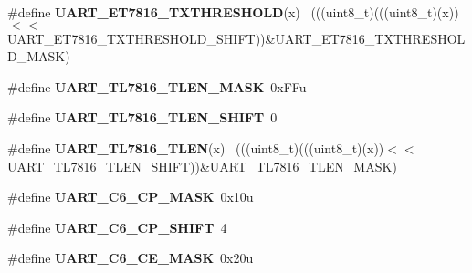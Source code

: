 \begin{DoxyCompactItemize}
\item 
\hypertarget{group___u_a_r_t___register___masks_ga0e12a6d9606ae3055889260cc5e0edff}{}\#define {\bfseries U\+A\+R\+T\+\_\+\+E\+T7816\+\_\+\+T\+X\+T\+H\+R\+E\+S\+H\+O\+L\+D}(x)                          ~(((uint8\+\_\+t)(((uint8\+\_\+t)(x))$<$$<$U\+A\+R\+T\+\_\+\+E\+T7816\+\_\+\+T\+X\+T\+H\+R\+E\+S\+H\+O\+L\+D\+\_\+\+S\+H\+I\+F\+T))\&U\+A\+R\+T\+\_\+\+E\+T7816\+\_\+\+T\+X\+T\+H\+R\+E\+S\+H\+O\+L\+D\+\_\+\+M\+A\+S\+K)\label{group___u_a_r_t___register___masks_ga0e12a6d9606ae3055889260cc5e0edff}

\item 
\hypertarget{group___u_a_r_t___register___masks_ga000fb6043015c4cb478d32febfb4a913}{}\#define {\bfseries U\+A\+R\+T\+\_\+\+T\+L7816\+\_\+\+T\+L\+E\+N\+\_\+\+M\+A\+S\+K}~0x\+F\+Fu\label{group___u_a_r_t___register___masks_ga000fb6043015c4cb478d32febfb4a913}

\item 
\hypertarget{group___u_a_r_t___register___masks_gaafcee96c5728fbbbc56c3b2ea55bd753}{}\#define {\bfseries U\+A\+R\+T\+\_\+\+T\+L7816\+\_\+\+T\+L\+E\+N\+\_\+\+S\+H\+I\+F\+T}~0\label{group___u_a_r_t___register___masks_gaafcee96c5728fbbbc56c3b2ea55bd753}

\item 
\hypertarget{group___u_a_r_t___register___masks_ga6665c13844ba2e5f1add9e33a5ae5d66}{}\#define {\bfseries U\+A\+R\+T\+\_\+\+T\+L7816\+\_\+\+T\+L\+E\+N}(x)                                        ~(((uint8\+\_\+t)(((uint8\+\_\+t)(x))$<$$<$U\+A\+R\+T\+\_\+\+T\+L7816\+\_\+\+T\+L\+E\+N\+\_\+\+S\+H\+I\+F\+T))\&U\+A\+R\+T\+\_\+\+T\+L7816\+\_\+\+T\+L\+E\+N\+\_\+\+M\+A\+S\+K)\label{group___u_a_r_t___register___masks_ga6665c13844ba2e5f1add9e33a5ae5d66}

\item 
\hypertarget{group___u_a_r_t___register___masks_ga5d0470debfaf46ca7b6a93d1d355f86f}{}\#define {\bfseries U\+A\+R\+T\+\_\+\+C6\+\_\+\+C\+P\+\_\+\+M\+A\+S\+K}~0x10u\label{group___u_a_r_t___register___masks_ga5d0470debfaf46ca7b6a93d1d355f86f}

\item 
\hypertarget{group___u_a_r_t___register___masks_gac2e9a024b2394693873266ae4ee160c8}{}\#define {\bfseries U\+A\+R\+T\+\_\+\+C6\+\_\+\+C\+P\+\_\+\+S\+H\+I\+F\+T}~4\label{group___u_a_r_t___register___masks_gac2e9a024b2394693873266ae4ee160c8}

\item 
\hypertarget{group___u_a_r_t___register___masks_gae74ad22ea00338ba61743a37108858c6}{}\#define {\bfseries U\+A\+R\+T\+\_\+\+C6\+\_\+\+C\+E\+\_\+\+M\+A\+S\+K}~0x20u\label{group___u_a_r_t___register___masks_gae74ad22ea00338ba61743a37108858c6}


\end{DoxyCompactItemize}
